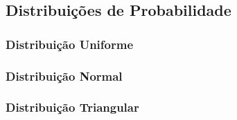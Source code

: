 \subsection{Distribuições de Probabilidade}
    \begin{frame}\frametitle{}
    \end{frame}
    
    \subsubsection{Distribuição Uniforme}
        \begin{frame}\frametitle{}
        \end{frame}
        
    \subsubsection{Distribuição Normal}
        \begin{frame}\frametitle{}
        \end{frame}
        
    \subsubsection{Distribuição Triangular}
        \begin{frame}\frametitle{}
        \end{frame}
  
